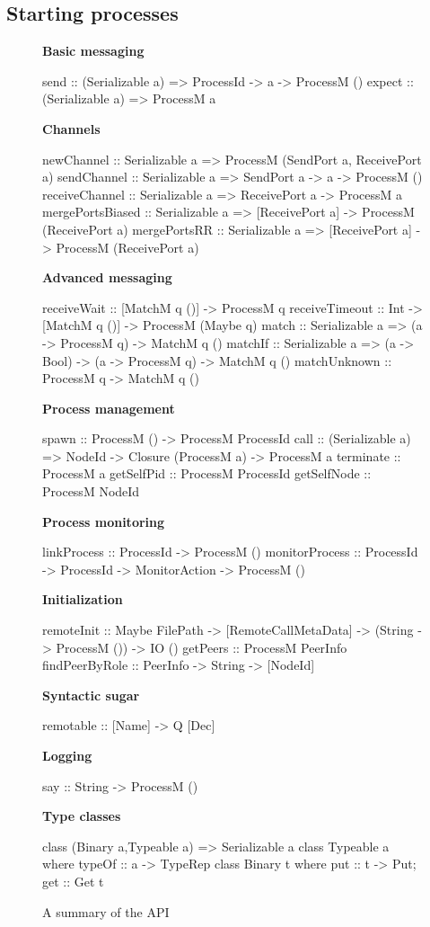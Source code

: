 \documentclass[preprint]{sigplanconf}
\begin{document}
\subsection{Starting processes}

\begin{figure}[t!]
\textbf{Basic messaging} 
\begin{code}
send :: (Serializable a) => ProcessId -> a -> ProcessM ()
expect :: (Serializable a) => ProcessM a
\end{code}
 \textbf{Channels}
\begin{code}
newChannel :: Serializable a => ProcessM (SendPort a, ReceivePort a)
sendChannel :: Serializable a => SendPort a -> a -> ProcessM ()
receiveChannel :: Serializable a => ReceivePort a -> ProcessM a
mergePortsBiased :: Serializable a => [ReceivePort a] -> ProcessM (ReceivePort a)
mergePortsRR :: Serializable a => [ReceivePort a] -> ProcessM (ReceivePort a)
\end{code}

 \textbf{Advanced messaging}
\begin{code}
receiveWait :: [MatchM q ()] -> ProcessM q
receiveTimeout :: Int -> [MatchM q ()] -> ProcessM (Maybe q)
match :: Serializable a => (a -> ProcessM q) -> MatchM q ()
matchIf :: Serializable a => (a -> Bool) -> (a -> ProcessM q) -> MatchM q ()
matchUnknown :: ProcessM q -> MatchM q ()
\end{code}

 \textbf{Process management}
\begin{code}
spawn :: ProcessM () -> ProcessM ProcessId
call :: (Serializable a) => NodeId -> Closure (ProcessM a) -> ProcessM a
terminate :: ProcessM a
getSelfPid :: ProcessM ProcessId
getSelfNode :: ProcessM NodeId
\end{code}

 \textbf{Process monitoring}
\begin{code}
linkProcess :: ProcessId -> ProcessM ()
monitorProcess :: ProcessId -> ProcessId -> MonitorAction -> ProcessM ()
\end{code}

 \textbf{Initialization}
\begin{code}
remoteInit :: Maybe FilePath -> [RemoteCallMetaData] -> (String -> ProcessM ()) -> IO ()
getPeers :: ProcessM PeerInfo
findPeerByRole :: PeerInfo -> String -> [NodeId]
\end{code}

 \textbf{Syntactic sugar}
\begin{code}
remotable :: [Name] -> Q [Dec]
\end{code}

 \textbf{Logging}
\begin{code}
say :: String -> ProcessM ()
\end{code}

 \textbf{Type classes}
\begin{code}
class (Binary a,Typeable a) => Serializable a
class Typeable a where typeOf :: a -> TypeRep
class Binary t where put :: t -> Put; get :: Get t
\end{code}
\caption{A summary of the API} \label{fig:api}
\end{figure}
\end{document}
